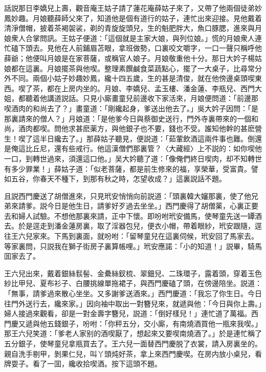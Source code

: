 話説那日李嬌兒上壽，觀音庵王姑子請了蓮花庵薛姑子來了，又帶了他兩個徒弟妙鳳妙趣。月娘聽薛師父來了，知道他是個有道行的姑子，連忙出來迎接。見他戴着清淨僧帽，披着茶褐袈裟，剃的青旋旋頭兒，生的魁肥胖大，魚口豚腮，進來與月娘衆人合掌問訊。王姑子便道：「這個就是主家大娘，與列位娘。」慌的月娘衆人連忙磕下頭去。見他在人前鋪眉苫眼，拿班做勢，口裏咬文嚼字，一口一聲只稱呼他薛爺；他便叫月娘是在家菩薩，或稱官人娘子。月娘敬重他十分。那日大妗子楊姑娘都在這裏。月娘擺茶與他喫。整理素饌鹹食菜蔬點心，擺了一大桌子，比尋常分外不同。兩個小姑子妙趣妙鳳，纔十四五歲，生的甚是清俊，就在他傍邊桌頭喫東西。喫了茶，都在上房内坐的。月娘、李嬌兒、孟玉樓、潘金蓮、李瓶兒、西門大姐，都聽着他講道説話。只見小廝畫童兒前邊收下家活來，月娘便問道：「前邊那喫酒肉的和尚去了？」畫童道：「剛纔起身，爹送出他去了。」吳大妗子因問：「是那裏請來的僧人？」月娘道：「是他爹今日與蔡御史送行，門外寺裏帶來的一個和尚，酒肉都喫。問他求甚麽薬方，與他銀子也不要，錢也不受。誰知他幹的甚麽營生！喫了這半日纔去了。」那薛姑子聽見，便説道：「茹葷飲酒這兩件事也難。倒還是俺這比丘尼，還有些戒行。他這漢僧們那裏管？〈大藏經〉上不説的：如你喫他一口，到轉世過來，須還這口他。」吴大妗聽了道：「像俺們終日喫肉，却不知轉世有多少罪業！」薛姑子道：「似老菩薩，都是前生修來的福，享榮華，受富貴。譬如五谷，你春天不種下，到那有秋之時，怎望收成？」這裏説話不題。

且説西門慶送了胡僧進來，只見玳安悄悄向前説道：「頭裏韓大嬸那裏，使了他兄弟來請爹。説今日是他生日，請爹好歹過去坐坐。」西門慶得了胡僧薬，心裏正要去和婦人試驗。不想他那裏來請，正中下懷。即吩咐玳安備馬，使琴童先送一罈酒去。於是逕走到潘金蓮房裏，取了淫器包兒，便衣小帽，帶着眼紗，玳安跟隨，逕往王六兒家來。下馬到裏面，就吩咐：「留琴童兒在這裏伺候，玳安回了馬家去。等家裏問，只説我在獅子街房子裏算帳哩。」玳安應諾：「小的知道！」説畢，騎馬囬家去了。

王六兒出來，戴着銀絲䯼髻、金纍絲釵梳、翠鈿兒、二珠環子，露着頭，穿着玉色紗比甲兒、夏布衫子、白腰挑線單拖裙子，與西門慶磕了頭，在傍邊陪坐。説道：「無事，請爹過來散心坐坐。又多謝爹送酒來。」西門慶道：「我忘了你生日。今日往門外送行去，纔來家。」因向袖中取出一對簪兒來，就遞與他：「今日與你上壽。」婦人接過來觀看，卻是一對金壽字簪兒，説道：「倒好樣兒！」連忙道了萬福。西門慶又遞與他五錢銀子，吩咐：「你秤五分，交小廝，有南燒酒買他一瓶來我喫。」那王六兒笑道：「爹老人家别的酒喫厭了，想起來又要喫南燒酒了。」於是連忙稱了五分銀子，使琴童兒拿瓶買去了。王六兒一面替西門慶脱了衣裳，請入房裏坐的。親自洗手剔甲，剝果仁兒，叫丫頭炖好茶，拿上來西門慶喫。在房内放小桌兒，看牌耍子。看了一囬，纔收拾喫酒。按下這頭不題。

